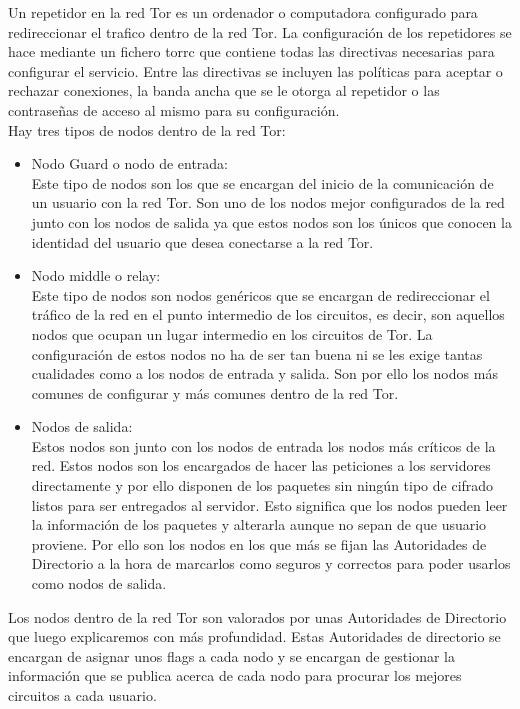 Un repetidor en la red Tor es un ordenador o computadora configurado para redireccionar el trafico dentro de la red Tor. La configuración de los repetidores se hace mediante un fichero torrc que contiene todas las directivas necesarias para configurar el servicio. Entre las directivas se incluyen las políticas para aceptar o rechazar conexiones, la banda ancha que se le otorga al repetidor o las contraseñas de acceso al mismo para su configuración.\\
Hay tres tipos de nodos dentro de la red Tor:
\begin{itemize}
	\item Nodo Guard o nodo de entrada:\\
		Este tipo de nodos son los que se encargan del inicio de la comunicación de un usuario con la red Tor. Son uno de los nodos mejor configurados de la red junto con los nodos de salida ya que estos nodos son los únicos que conocen la identidad del usuario que desea conectarse a la red Tor.
	\item Nodo middle o relay:\\
		Este tipo de nodos son nodos genéricos que se encargan de redireccionar el tráfico de la red en el punto intermedio de los circuitos, es decir, son aquellos nodos que ocupan un lugar intermedio en los circuitos de Tor. La configuración de estos nodos no ha de ser tan buena ni se les exige tantas cualidades como a los nodos de entrada y salida. Son por ello los nodos más comunes de configurar y más comunes dentro de la red Tor.
	\item Nodos de salida:\\
		Estos nodos son junto con los nodos de entrada los nodos más críticos de la red. Estos nodos son los encargados de hacer las peticiones a los servidores directamente y por ello disponen de los paquetes sin ningún tipo de cifrado listos para ser entregados al servidor. Esto significa que los nodos pueden leer la información de los paquetes y alterarla aunque no sepan de que usuario proviene. Por ello son los nodos en los que más se fijan las Autoridades de Directorio a la hora de marcarlos como seguros y correctos para poder usarlos como nodos de salida.
\end{itemize}
Los nodos dentro de la red Tor son valorados por unas Autoridades de Directorio que luego explicaremos con más profundidad. Estas Autoridades de directorio se encargan de asignar unos flags a cada nodo y se encargan de gestionar la información que se publica acerca de cada nodo para procurar los mejores circuitos a cada usuario.\\
